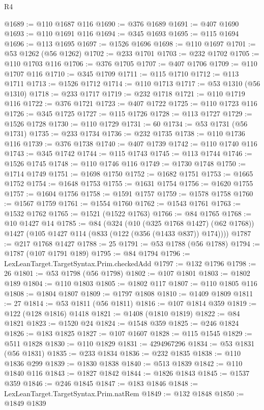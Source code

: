\begin{lexlean}{R4}
\begin{coremodule}
@1689 := @110 @1687 @116
@1690 := @376 @1689
@1691 := @407 @1690
@1693 := @110 @1691 @116
@1694 := @345 @1693
@1695 := @115 @1694
@1696 := @113 @1695
@1697 := @1526 @1696
@1698 := @110 @1697
@1701 := @53 @1262 (@56 @1262)
@1702 := @233 @1701
@1703 := @232 @1702
@1705 := @110 @1703 @116
@1706 := @376 @1705
@1707 := @407 @1706
@1709 := @110 @1707 @116
@1710 := @345 @1709
@1711 := @115 @1710
@1712 := @113 @1711
@1713 := @1526 @1712
@1714 := @110 @1713
@1717 := @53 @1310 (@56 @1310)
@1718 := @233 @1717
@1719 := @232 @1718
@1721 := @110 @1719 @116
@1722 := @376 @1721
@1723 := @407 @1722
@1725 := @110 @1723 @116
@1726 := @345 @1725
@1727 := @115 @1726
@1728 := @113 @1727
@1729 := @1526 @1728
@1730 := @110 @1729
@1731 := 60
@1734 := @53 @1731 (@56 @1731)
@1735 := @233 @1734
@1736 := @232 @1735
@1738 := @110 @1736 @116
@1739 := @376 @1738
@1740 := @407 @1739
@1742 := @110 @1740 @116
@1743 := @345 @1742
@1744 := @115 @1743
@1745 := @113 @1744
@1746 := @1526 @1745
@1748 := @110 @1746 @116
@1749 := @1730 @1748
@1750 := @1714 @1749
@1751 := @1698 @1750
@1752 := @1682 @1751
@1753 := @1665 @1752
@1754 := @1648 @1753
@1755 := @1631 @1754
@1756 := @1620 @1755
@1757 := @1604 @1756
@1758 := @1591 @1757
@1759 := @1578 @1758
@1760 := @1567 @1759
@1761 := @1554 @1760
@1762 := @1543 @1761
@1763 := @1532 @1762
@1765 := @1521 (@1522 @1763)
@1766 := @84 @1765
@1768 := @10 @1427 @14
@1785 := @84
    (@324
      (@10 (@325 @1768 @1427) (@62 @1768))
      @1427
      (@105 @1427 @114 (@833 (@122 (@356 (@1433 @837)) @174))))
@1787 := @217 @1768 @1427
@1788 := 25
@1791 := @53 @1788 (@56 @1788)
@1794 := @1787 (@107 @1791 @189)
@1795 := @84 @1794
@1796 := LexLeanTarget.TargetSyntax.Prim.checkedAdd
@1797 := @132 @1796
@1798 := 26
@1801 := @53 @1798 (@56 @1798)
@1802 := @107 @1801
@1803 := @1802 @189
@1804 := @110 @1803
@1805 := @1802 @117
@1807 := @110 @1805 @116
@1808 := @1804 @1807
@1809 := @1797 @1808
@1810 := @1409 @1809
@1811 := 27
@1814 := @53 @1811 (@56 @1811)
@1816 := @107 @1814 @359
@1819 := @122 (@128 @1816) @1418
@1821 := @1408 (@1810 @1819)
@1822 := @84 @1821
@1823 := @1520 @24
@1824 := @1548 @359
@1825 := @246 @1824
@1826 := @183 @1825
@1827 := @107 @1607
@1828 := @115 @1545
@1829 := @511 @1828
@1830 := @110 @1829
@1831 := 4294967296
@1834 := @53 @1831 (@56 @1831)
@1835 := @233 @1834
@1836 := @232 @1835
@1838 := @110 @1836 @299
@1839 := @1830 @1838
@1840 := @513 @1839
@1842 := @110 @1840 @116
@1843 := @1827 @1842
@1844 := @1826 @1843
@1845 := @1537 @359
@1846 := @246 @1845
@1847 := @183 @1846
@1848 := LexLeanTarget.TargetSyntax.Prim.natRem
@1849 := @132 @1848
@1850 := @1849 @1839

\end{coremodule}
\end{lexlean}
